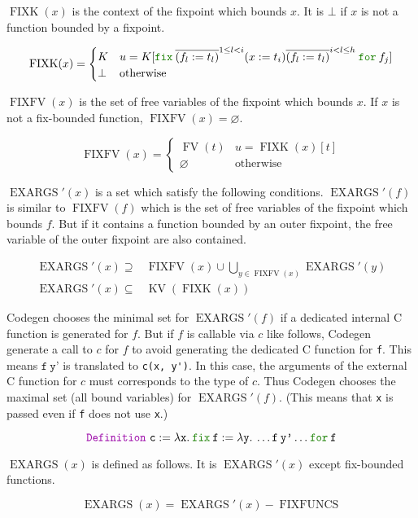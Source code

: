 \documentclass[a4paper,fleqn]{article}
\def\codegen{\textrm{Codegen}}
\newcommand{\kwDefinition}{\mbox{\color{myviolet}\ttfamily Definition}}
\newcommand{\kwfix}{\mbox{\color{mygreen}\ttfamily fix}}
\newcommand{\kwfor}{\mbox{\color{mygreen}\ttfamily for}}
\newcommand{\lam}[2]{\lambda #1.\:#2}
\newcommand{\ofix}[2]{\kwfix\:{#1}\:\kwfor\:{#2}}
\DeclareMathOperator{\FV}{FV}
\DeclareMathOperator{\KV}{KV}
\DeclareMathOperator{\FIXFUNCS}{FIXFUNCS}
\DeclareMathOperator{\FIXK}{FIXK}
\DeclareMathOperator{\FIXFV}{FIXFV}
\DeclareMathOperator{\EXARGS}{EXARGS}
\newcommand{\repi}[2]{\overline{#1}^{#2}}
\begin{document}
$\FIXK(x)$ is the context of the fixpoint which bounds $x$.
It is $\bot$ if $x$ is not a function bounded by a fixpoint.

\[
  \FIXK(x) =
  \begin{cases}
    K & u = K[\ofix{\repi{(f_l:=t_l)}{1\leq l < i} (x:=t_i) \repi{(f_l:=t_l)}{i < l \leq h}}{f_j}]  \\
    \bot & \text{otherwise}
  \end{cases}
\]

$\FIXFV(x)$ is the set of free variables of the fixpoint which bounds $x$.
If $x$ is not a fix-bounded function, $\FIXFV(x)=\varnothing$.

\[
  \FIXFV(x) =
  \begin{cases}
    \FV(t) & u = \FIXK(x)[t]  \\
    \varnothing & \text{otherwise}
  \end{cases}
\]

$\EXARGS'(x)$ is a set which satisfy the following conditions.
$\EXARGS'(f)$ is similar to $\FIXFV(f)$ which is the set of free variables of the fixpoint which bounds $f$.
But if it contains a function bounded by an outer fixpoint, the free variable of the outer fixpoint are also contained.

\begin{align*}
  \EXARGS'(x) \supseteq& \FIXFV(x) \cup \bigcup_{y \in \FIXFV(x)} \EXARGS'(y) \\
  \EXARGS'(x) \subseteq& \KV(\FIXK(x))
\end{align*}

\codegen{} chooses the minimal set for $\EXARGS'(f)$ if a dedicated internal C function is generated for $f$.
But if $f$ is callable via $c$ like follows, \codegen{} generate a call to $c$ for $f$
to avoid generating the dedicated C function for \texttt{f}.
This means $\texttt{f}\:\texttt{y'}$ is translated to \lstinline[style=Cstyle]!c(x, y')!.
In this case, the arguments of the external C function for $c$ must corresponds to the type of $c$.
Thus \codegen{} chooses the maximal set (all bound variables) for $\EXARGS'(f)$.
(This means that \texttt{x} is passed even if \texttt{f} does not use \texttt{x}.)

\[
  \kwDefinition~\texttt{c} := \lam{\texttt{x}}{\ofix{\texttt{f}:=\lam{\texttt{y}}{\ldots \texttt{f}\:\texttt{y'} \ldots}}{\texttt{f}}}
\]

$\EXARGS(x)$ is defined as follows.
It is $\EXARGS'(x)$ except fix-bounded functions.

\[
  \EXARGS(x) = \EXARGS'(x) - \FIXFUNCS
\]
\end{document}
